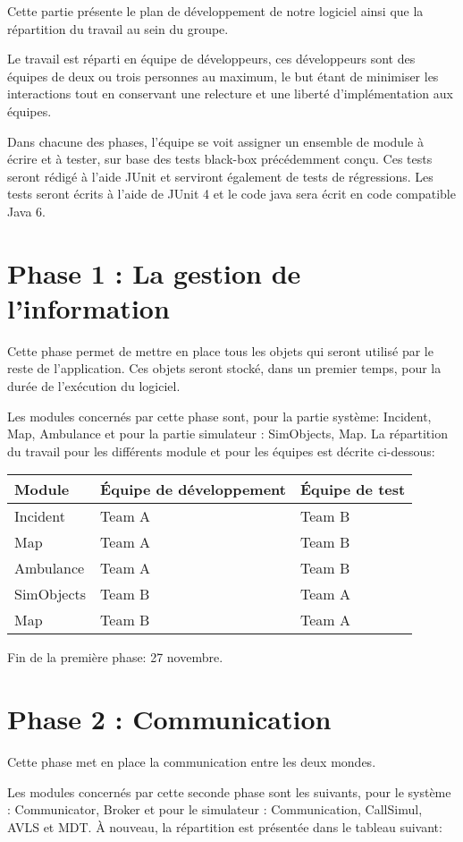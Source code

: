 Cette partie présente le plan de développement de notre logiciel ainsi que
la répartition du travail au sein du groupe.

Le travail est réparti en équipe de développeurs, ces développeurs sont des
équipes de deux ou trois personnes au maximum, le but étant de minimiser les 
interactions tout en conservant une relecture et une liberté d'implémentation
aux équipes.

Dans chacune des phases, l'équipe se voit assigner un ensemble de module à 
écrire et à tester, sur base des tests black-box précédemment conçu. Ces tests
seront rédigé à l'aide JUnit et serviront également de tests de régressions.
Les tests seront écrits à l'aide de JUnit 4 et le code java sera écrit
en code compatible Java 6.

\section{Phase 1 : La gestion de l'information}
Cette phase permet de mettre en place tous les objets qui seront utilisé
par le reste de l'application. Ces objets seront stocké, dans un premier
temps, pour la durée de l'exécution du logiciel.

Les modules concernés par cette phase sont, pour la
partie système: Incident, Map, Ambulance et pour la partie simulateur : SimObjects, Map.
La répartition du travail pour 
les différents module et pour les équipes est décrite ci-dessous:

\noindent\begin{tabularx}{\textwidth}{|l|l|X|}
\hline
Module			& 	Équipe de développement & Équipe de test\\
\hline
Incident	&	Team A 	&	Team B	\\
Map 		&	Team A	&	Team B	\\
Ambulance	&	Team A  &	Team B	\\
SimObjects	&	Team B  &	Team A	\\
Map			&	Team B  &	Team A	\\
\hline
\end{tabularx}

Fin de la première phase: 27 novembre.

\section{Phase 2 : Communication}
Cette phase met en place la communication entre les deux mondes.

Les modules concernés par cette seconde phase sont les suivants, pour
le système : Communicator, Broker et pour le simulateur : Communication, CallSimul, AVLS et MDT.
À nouveau, la répartition est présentée dans le tableau suivant:

